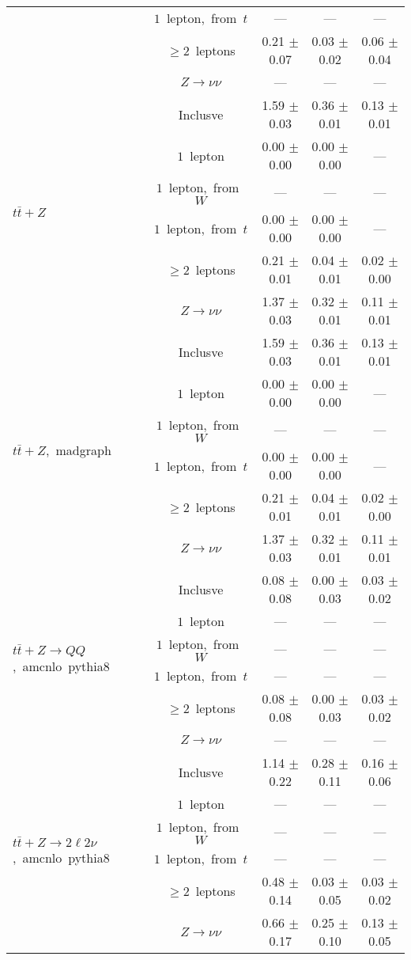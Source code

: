 \documentclass{article}
\begin{document}
\begin{longtable}{|l|c|c|c|c|}
 & $1$~lepton,~from~$t$  & ---  & ---  & --- \\* 
 & $\ge2$~leptons  & 0.21 $\pm$ 0.07  & 0.03 $\pm$ 0.02  & 0.06 $\pm$ 0.04 \\* 
 & $Z\rightarrow\nu\nu$  & ---  & ---  & --- \\* 
\hline 
\multirow{6}{*}{$t\bar{t}+Z$} & Inclusve  & 1.59 $\pm$ 0.03  & 0.36 $\pm$ 0.01  & 0.13 $\pm$ 0.01 \\* 
 & $1$~lepton  & 0.00 $\pm$ 0.00  & 0.00 $\pm$ 0.00  & --- \\* 
 & $1$~lepton,~from~$W$  & ---  & ---  & --- \\* 
 & $1$~lepton,~from~$t$  & 0.00 $\pm$ 0.00  & 0.00 $\pm$ 0.00  & --- \\* 
 & $\ge2$~leptons  & 0.21 $\pm$ 0.01  & 0.04 $\pm$ 0.01  & 0.02 $\pm$ 0.00 \\* 
 & $Z\rightarrow\nu\nu$  & 1.37 $\pm$ 0.03  & 0.32 $\pm$ 0.01  & 0.11 $\pm$ 0.01 \\* 
\hline 
\multirow{6}{*}{$t\bar{t}+Z$,~madgraph} & Inclusve  & 1.59 $\pm$ 0.03  & 0.36 $\pm$ 0.01  & 0.13 $\pm$ 0.01 \\* 
 & $1$~lepton  & 0.00 $\pm$ 0.00  & 0.00 $\pm$ 0.00  & --- \\* 
 & $1$~lepton,~from~$W$  & ---  & ---  & --- \\* 
 & $1$~lepton,~from~$t$  & 0.00 $\pm$ 0.00  & 0.00 $\pm$ 0.00  & --- \\* 
 & $\ge2$~leptons  & 0.21 $\pm$ 0.01  & 0.04 $\pm$ 0.01  & 0.02 $\pm$ 0.00 \\* 
 & $Z\rightarrow\nu\nu$  & 1.37 $\pm$ 0.03  & 0.32 $\pm$ 0.01  & 0.11 $\pm$ 0.01 \\* 
\hline 
\multirow{6}{*}{$t\bar{t}+Z{\rightarrow}QQ$,~amcnlo~pythia8} & Inclusve  & 0.08 $\pm$ 0.08  & 0.00 $\pm$ 0.03  & 0.03 $\pm$ 0.02 \\* 
 & $1$~lepton  & ---  & ---  & --- \\* 
 & $1$~lepton,~from~$W$  & ---  & ---  & --- \\* 
 & $1$~lepton,~from~$t$  & ---  & ---  & --- \\* 
 & $\ge2$~leptons  & 0.08 $\pm$ 0.08  & 0.00 $\pm$ 0.03  & 0.03 $\pm$ 0.02 \\* 
 & $Z\rightarrow\nu\nu$  & ---  & ---  & --- \\* 
\hline 
\multirow{6}{*}{$t\bar{t}+Z{\rightarrow}2{\ell}2{\nu}$,~amcnlo~pythia8} & Inclusve  & 1.14 $\pm$ 0.22  & 0.28 $\pm$ 0.11  & 0.16 $\pm$ 0.06 \\* 
 & $1$~lepton  & ---  & ---  & --- \\* 
 & $1$~lepton,~from~$W$  & ---  & ---  & --- \\* 
 & $1$~lepton,~from~$t$  & ---  & ---  & --- \\* 
 & $\ge2$~leptons  & 0.48 $\pm$ 0.14  & 0.03 $\pm$ 0.05  & 0.03 $\pm$ 0.02 \\* 
 & $Z\rightarrow\nu\nu$  & 0.66 $\pm$ 0.17  & 0.25 $\pm$ 0.10  & 0.13 $\pm$ 0.05 \\* 
\hline 
\end{longtable} 
\end{document}
